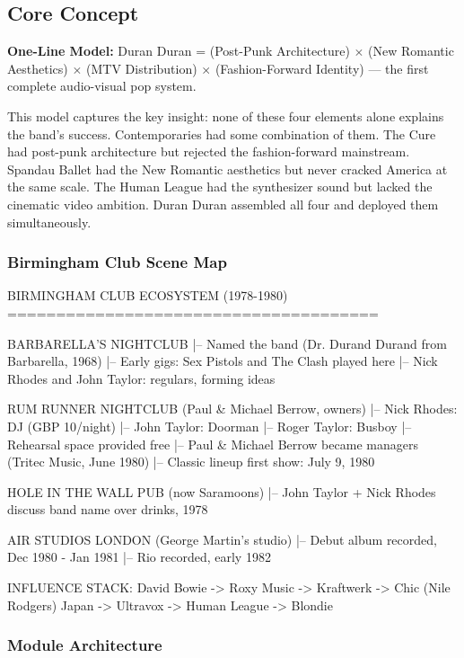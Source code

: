 \documentclass[11pt,letterpaper]{article}
\begin{document}
\subsection{Core Concept}

\textbf{One-Line Model:} Duran Duran = (Post-Punk Architecture) $\times$ (New Romantic Aesthetics) $\times$ (MTV Distribution) $\times$ (Fashion-Forward Identity) --- the first complete audio-visual pop system.

This model captures the key insight: none of these four elements alone explains the band's success. Contemporaries had some combination of them. The Cure had post-punk architecture but rejected the fashion-forward mainstream. Spandau Ballet had the New Romantic aesthetics but never cracked America at the same scale. The Human League had the synthesizer sound but lacked the cinematic video ambition. Duran Duran assembled all four and deployed them simultaneously.

\subsubsection{Birmingham Club Scene Map}

\begin{asciibox}
BIRMINGHAM CLUB ECOSYSTEM (1978-1980)
======================================

BARBARELLA'S NIGHTCLUB
  |-- Named the band (Dr. Durand Durand from Barbarella, 1968)
  |-- Early gigs: Sex Pistols and The Clash played here
  |-- Nick Rhodes and John Taylor: regulars, forming ideas

RUM RUNNER NIGHTCLUB (Paul & Michael Berrow, owners)
  |-- Nick Rhodes: DJ (GBP 10/night)
  |-- John Taylor: Doorman
  |-- Roger Taylor: Busboy
  |-- Rehearsal space provided free
  |-- Paul & Michael Berrow became managers (Tritec Music, June 1980)
  |-- Classic lineup first show: July 9, 1980

HOLE IN THE WALL PUB (now Saramoons)
  |-- John Taylor + Nick Rhodes discuss band name over drinks, 1978

AIR STUDIOS LONDON (George Martin's studio)
  |-- Debut album recorded, Dec 1980 - Jan 1981
  |-- Rio recorded, early 1982

INFLUENCE STACK:
  David Bowie -> Roxy Music -> Kraftwerk -> Chic (Nile Rodgers)
  Japan -> Ultravox -> Human League -> Blondie
\end{asciibox}

\subsubsection{Module Architecture}
\end{document}
